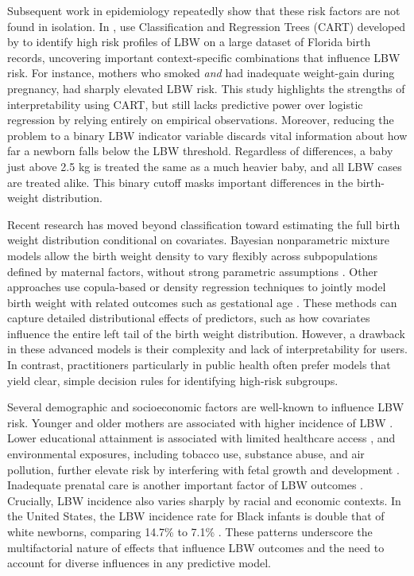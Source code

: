 Subsequent work in epidemiology repeatedly show that these risk factors are not found in isolation. In \citeyear{KITSANTAS2006275}, \textcite{KITSANTAS2006275} use Classification and Regression Trees (CART) developed by \textcite{breiman1984classification} to identify high risk profiles of LBW on a large dataset of Florida birth records, uncovering important context-specific combinations that influence LBW risk. For instance, mothers who smoked \emph{and} had inadequate weight-gain during pregnancy, had sharply elevated LBW risk. This study highlights the strengths of interpretability using CART, but still lacks predictive power over logistic regression by relying entirely on empirical observations. Moreover, reducing the problem to a binary LBW indicator variable discards vital information about how far a newborn falls below the LBW threshold. Regardless of differences, a baby just above 2.5 kg is treated the same as a much heavier baby, and all LBW cases are treated alike. This binary cutoff masks important differences in the birth-weight distribution.

Recent research has moved beyond classification toward estimating the full birth weight distribution conditional on covariates. Bayesian nonparametric mixture models allow the birth weight density to vary flexibly across subpopulations defined by maternal factors, without strong parametric assumptions \parencite{dunson2008}. Other approaches use copula-based or density regression techniques to jointly model birth weight with related outcomes such as gestational age \parencite{rathjens2023}. These methods can capture detailed distributional effects of predictors, such as how covariates influence the entire left tail of the birth weight distribution. However, a drawback in these advanced models is their complexity and lack of interpretability for users. In contrast, practitioners particularly in public health often prefer models that yield clear, simple decision rules for identifying high-risk subgroups. 

Several demographic and socioeconomic factors are well-known to influence LBW risk. Younger and older mothers are associated with higher incidence of LBW \parencite{age_differences_lbw}. Lower educational attainment is associated with limited healthcare access \parencite{finch2003,jain2024}, and environmental exposures, including tobacco use, substance abuse, and air pollution, further elevate risk by interfering with fetal growth and development \parencite{standford_med_lbw, lu2020combined}. Inadequate prenatal care is another important factor of LBW outcomes \parencite{prenatal_lbw}. Crucially, LBW incidence also varies sharply by racial and economic contexts. In the United States, the LBW incidence rate for Black infants is double that of white newborns, comparing 14.7\% to 7.1\%  \parencite{marchofdimes2024}. These patterns underscore the multifactorial nature of effects that influence LBW outcomes and the need to account for diverse influences in any predictive model. 

